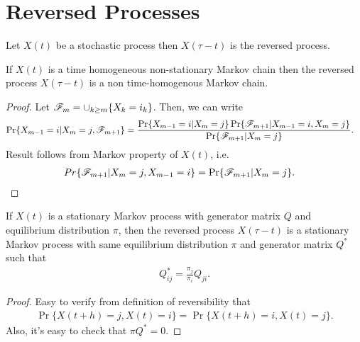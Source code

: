\documentclass[a4paper,10pt,english]{article}
\begin{document}
\section{Reversed Processes}
Let $X(t)$ be a stochastic process then $X(\tau-t)$ is the reversed process.
\begin{lem} 
If $X(t)$ is a time homogeneous non-stationary Markov chain then the reversed process $X(\tau -t)$ is a non time-homogenous Markov chain.
\end{lem}
\begin{proof} Let $\mathscr{F}_m = \cup_{k \geq m}\{X_k = i_k\}$. Then, we can write
\begin{align*}
\Pr\{X_{m-1}=i|X_m=j,\F_{m+1}\} %
&=\frac{\Pr\{X_{m-1}=i|X_m=j\}\Pr\{\F_{m+1} |X_{m-1}=i,X_m=j \}}{\Pr\{\F_{m+1} |X_m=j\}}.
\end{align*}
Result follows from Markov property of $X(t)$, i.e.
\begin{align*}
Pr\{\mathscr{F}_{m+1} |X_m= j, X_{m-1} = i \} &=\Pr\{\mathscr{F}_{m+1}|X_m=j\}.
\end{align*}
\end{proof}

\begin{lem} 
If $X(t)$ is a stationary Markov process with generator matrix $Q$ and equilibrium distribution $\pi$, then the reversed process $X(\tau -t)$ is a stationary Markov process with same equilibrium distribution $\pi$ and generator matrix $Q^{\ast}$ such that
\begin{align*}
Q^{\ast}_{ij} = \frac{\pi_j}{\pi_i}Q_{ji}.
\end{align*}
\end{lem}
\begin{proof} Easy to verify from definition of reversibility that 
\begin{align*}
\Pr\{X(t+h) = j, X(t) = i\} = \Pr\{X(t+h) = i, X(t) = j\}.
\end{align*}
Also, it's easy to check that $\pi Q^{\ast} = 0$.
\end{proof}
\end{document}
